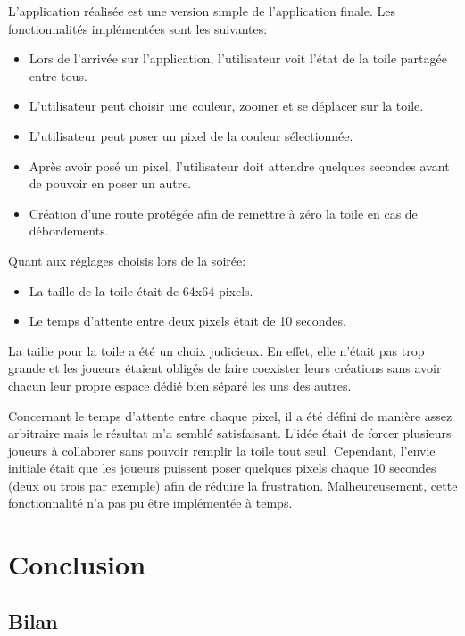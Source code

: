 L'application réalisée est une version simple de l'application finale. Les fonctionnalités implémentées sont les suivantes:

\begin{itemize}
  \item Lors de l'arrivée sur l'application, l'utilisateur voit l'état de la toile partagée entre tous.
  \item L'utilisateur peut choisir une couleur, zoomer et se déplacer sur la toile.
  \item L'utilisateur peut poser un pixel de la couleur sélectionnée.
  \item Après avoir posé un pixel, l'utilisateur doit attendre quelques secondes avant de pouvoir en poser un autre.
  \item Création d'une route protégée afin de remettre à zéro la toile en cas de débordements.
\end{itemize}

Quant aux réglages choisis lors de la soirée:

\begin{itemize}
  \item La taille de la toile était de 64x64 pixels.
  \item Le temps d'attente entre deux pixels était de 10 secondes.
\end{itemize}

La taille pour la toile a été un choix judicieux. En effet, elle n'était pas trop grande et les joueurs étaient obligés de faire coexister leurs créations sans avoir chacun leur propre espace dédié bien séparé les uns des autres.

Concernant le temps d'attente entre chaque pixel, il a été défini de manière assez arbitraire mais le résultat m'a semblé satisfaisant. L'idée était de forcer plusieurs joueurs à collaborer sans pouvoir remplir la toile tout seul. Cependant, l'envie initiale était que les joueurs puissent poser quelques pixels chaque 10 secondes (deux ou trois par exemple) afin de réduire la frustration. Malheureusement, cette fonctionnalité n'a pas pu être implémentée à temps.

\section{Conclusion}

\subsection{Bilan}

